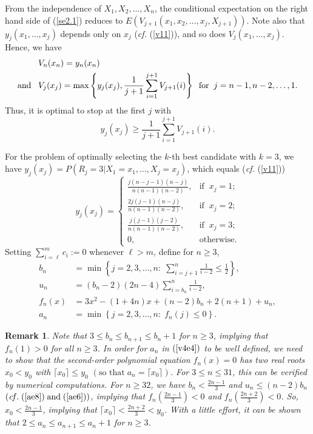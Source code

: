 \documentclass[12pt, A4paper, oneside]{article}
\theoremstyle{plain}
\newtheorem{rem}{Remark}[section]
\numberwithin{equation}{section}
\begin{document}
From the independence of $X_1,X_2,\dots,X_n$, the conditional expectation on the right hand side of (\ref{se2.1}) reduces to $E(V_{j+1}(x_1,x_2,\dots,x_j,X_{j+1}))$. Note also that $y_j(x_1,\dots,x_j)$ depends only on  $x_j$ ({\it cf.} (\ref{v11})), and so does $V_j(x_1,\dots,x_j)$. Hence,
we have
\begin{align}
&V_n(x_n)=y_n(x_n)\notag\\
\mbox{and}\;\;\;&V_j(x_j)=\max\left\{y_j(x_j),\frac{1}{j+1}\sum_{i=1}^{j+1}V_{j+1}(i)\right\}\;\;\mbox{for}\;\;j=n-1,n-2,\dots,1.\label{b4}
\end{align}
Thus, it is optimal to stop at the first $j$ with
\begin{equation*}
y_j(x_j)\ge\frac{1}{j+1}\sum_{i=1}^{j+1}V_{j+1}(i).
\end{equation*}



For the problem of optimally selecting the $k$-th best candidate with $k=3$,
we have $y_j(x_j)=P(R_j=3|X_1=x_1,\dots,X_j=x_j)$, which equals  ({\it cf.} (\ref{v11}))
\begin{equation}\label{e15}
y_j(x_j)=
\begin{cases}
\displaystyle\frac{j(n-j-1)(n-j)}{n(n-1)(n-2)},&\mbox{if}\;\;x_j=1;\\[4mm]
\displaystyle\frac{2j(j-1)(n-j)}{n(n-1)(n-2)},&\mbox{if}\;\;x_j=2;\\[4mm]
\displaystyle\frac{j(j-1)(j-2)}{n(n-1)(n-2)},&\mbox{if}\;\;x_j=3;\\[4mm]
0,&\mbox{otherwise}.
\end{cases}
\end{equation}
Setting $\sum_{i=\ell}^m c_i:=0$ whenever $\ell>m$, define for $n\ge3$,
\begin{align}
b_n&=\min\left\{j=2,3,\dots,n:\;\sum_{i=j+1}^n\frac{1}{i-2}\le\frac{1}{2}\right\},\label{v4e1}\\
u_n&=(b_n-2)(2n-4)\sum_{i=b_n}^n\frac{1}{i-2},\label{v4e2}\\
f_n(x)&=3x^2-(1+4n)x+(n-2)b_n+2(n+1)+u_n,\label{v4e3}\\
a_n&=\min\left\{j=2,3,\dots,n:\;f_n(j)\le0\right\}.\label{v4e4}
\end{align}

\begin{rem}
Note that  $3 \le b_n\le b_{n+1} \le b_n+1$ for
$n\ge 3$, implying that $f_n(1)>0$ for all $n\ge3$.
In order for $a_n$ in $(\ref{v4e4})$ to be well defined, we need to show that the second-order polynomial equation $f_n(x)=0$ has two real roots $x_0<y_0$ with $\lceil x_0\rceil\le y_0$ $(\mbox{so that}\; a_n=\lceil x_0\rceil)$. For $3\le n\le 31$, this can be verified by numerical computations. For $n\ge32$, we have $b_n<\frac{2n-1}{3}$ and $u_n\le(n-2)b_n$ $({\it cf.} \;(\ref{ae8})\;\mbox{and} \;(\ref{ae6}))$, implying that $f_n(\frac{2n-1}{3})<0$ and $f_n(\frac{2n+2}{3})<0$. So, $x_0<\frac{2n-1}{3}$, implying that $\lceil x_0\rceil<\frac{2n+2}{3}<y_0$.
With a little effort, it can be shown that $2 \le a_n\le a_{n+1}\le a_n+1$ for $n\ge 3$.
\end{rem}
\end{document}

